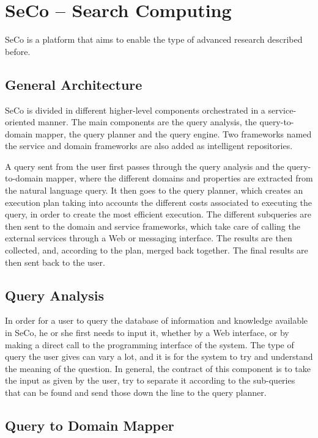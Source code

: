 \section{SeCo -- Search Computing}

SeCo is a platform that aims to enable the type of advanced research described before.

\subsection{General Architecture}

SeCo is divided in different higher-level components orchestrated in a service-oriented manner. The main components are the query analysis, the query-to-domain mapper, the query planner and the query engine. Two frameworks named the service and domain frameworks are also added as intelligent repositories.

A query sent from the user first passes through the query analysis and the query-to-domain mapper, where the different domains and properties are extracted from the natural language query. It then goes to the query planner, which creates an execution plan taking into accounts the different costs associated to executing the query, in order to create the most efficient execution. The different subqueries are then sent to the domain and service frameworks, which take care of calling the external services through a Web or messaging interface. The results are then collected, and, according to the plan, merged back together. The final results are then sent back to the user.

\subsection{Query Analysis}

In order for a user to query the database of information and knowledge available in SeCo, he or she first needs to input it, whether by a Web interface, or by making a direct call to the programming interface of the system. The type of query the user gives can vary a lot, and it is for the system to try and understand the meaning of the question. In general, the contract of this component is to take the input as given by the user, try to separate it according to the sub-queries that can be found and send those down the line to the query planner.

\subsection{Query to Domain Mapper} %
\label{sub:query_to_domain_mapper}

